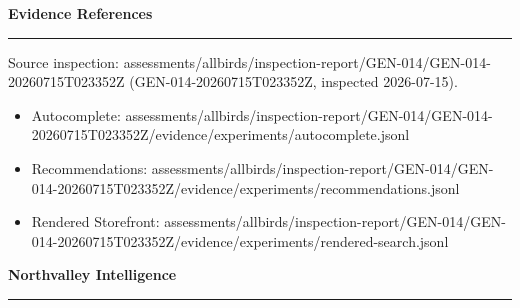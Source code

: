 \documentclass[10pt]{article}
\newcommand{\ReportSection}[1]{%
  \vspace{0.12in}
  {\fontsize{15}{18}\selectfont\bfseries\color{NVIInk}#1}\\[-0.02in]
  {\color{NVIAccent}\rule{\linewidth}{0.8pt}}
  \vspace{0.07in}
}
\newcommand{\ReportFine}[1]{{\fontsize{7.6}{9.1}\selectfont\color{NVIMuted}#1}}
\begin{document}
\vspace{0.14in}
\ReportSection{Evidence References}
\ReportFine{Source inspection: assessments/allbirds/inspection-report/GEN-014/GEN-014-20260715T023352Z (GEN-014-20260715T023352Z, inspected 2026-07-15).}\par
\begin{itemize}
\item \ReportFine{Autocomplete: assessments/allbirds/inspection-report/GEN-014/GEN-014-20260715T023352Z/evidence/experiments/autocomplete.jsonl}
\item \ReportFine{Recommendations: assessments/allbirds/inspection-report/GEN-014/GEN-014-20260715T023352Z/evidence/experiments/recommendations.jsonl}
\item \ReportFine{Rendered Storefront: assessments/allbirds/inspection-report/GEN-014/GEN-014-20260715T023352Z/evidence/experiments/rendered-search.jsonl}
\end{itemize}
\vfill
\begin{center}
{\fontsize{16}{19}\selectfont\bfseries\color{NVIInk}Northvalley Intelligence}\\[0.06in]
{\color{NVIAccent}\rule{2.2in}{0.8pt}}\\[0.08in]
\ReportFine{\NorthvalleyContactLine}
\end{center}
\end{document}
